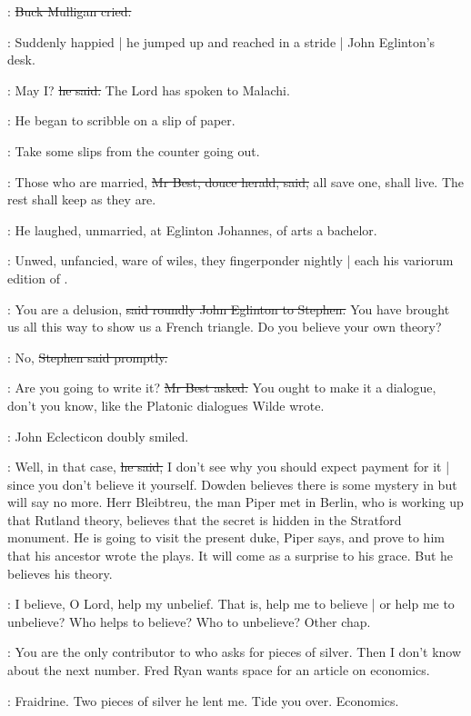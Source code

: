 \mulligan:
\sout{Buck Mulligan cried.}

:
Suddenly happied |
he jumped up and reached in a stride |
John Eglinton's desk.

\mulligan:
May I?
\sout{he said.}
The Lord has spoken to Malachi.

:
He began to scribble on a slip of paper.

\StephenInt:
Take some slips from the counter going out.

\best:
Those who are married,
\sout{Mr Best, douce herald, said,}
all save one,
shall live.
The rest shall keep as they are.

:
He laughed,
unmarried,
at Eglinton Johannes,
of arts a bachelor.

\StephenInt:
Unwed,
unfancied,
ware of wiles,
they fingerponder nightly |
each his variorum edition of .

\eglinton:
You are a delusion,
\sout{said roundly John Eglinton to Stephen.}
You have brought us all this way to show us a French triangle.
Do you believe your own theory?

\Stephen:
No,
\sout{Stephen said promptly.}

\best:
Are you going to write it?
\sout{Mr Best asked.}
You ought to make it a dialogue,
don't you know,
like the Platonic dialogues Wilde wrote.

:
John Eclecticon doubly smiled.

\eglinton:
Well,
in that case,
\sout{he said,}
I don't see why you should expect payment for it |
since you don't believe it yourself.
Dowden believes there is some mystery in  but will say no more.
Herr Bleibtreu,
the man Piper met in Berlin,
who is working up that Rutland theory,
believes that the secret is hidden in the Stratford monument.
He is going to visit the present duke,
Piper says,
and prove to him that his ancestor wrote the plays.
It will come as a surprise to his grace.
But he believes his theory.

\StephenInt:
I believe,
O Lord, help my unbelief.
That is, help me to believe |
or help me to unbelieve?
Who helps to believe?
Who to unbelieve?
Other chap.%

\eglinton:
You are the only contributor to  who asks for pieces of silver.
Then I don't know about the next number.
Fred Ryan wants space for an article on economics.

\StephenInt:
Fraidrine.
Two pieces of silver he lent me.
Tide you over.
Economics.

